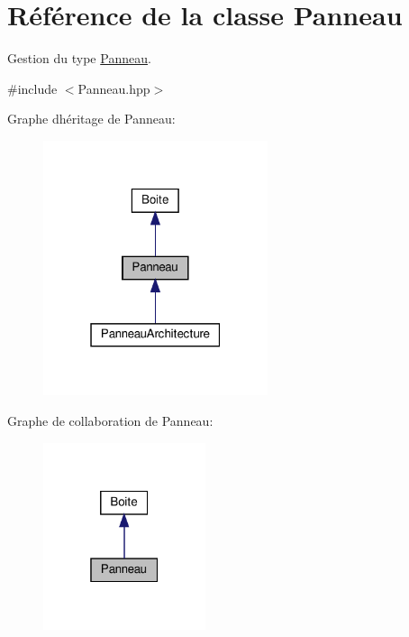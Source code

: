 \hypertarget{classPanneau}{}\section{Référence de la classe Panneau}
\label{classPanneau}


Gestion du type \hyperlink{classPanneau}{Panneau}.  




{\ttfamily \#include $<$Panneau.\+hpp$>$}



Graphe d\textquotesingle{}héritage de Panneau\+:
\nopagebreak
\begin{figure}[H]
\begin{center}
\leavevmode
\includegraphics[width=187pt]{classPanneau__inherit__graph}
\end{center}
\end{figure}


Graphe de collaboration de Panneau\+:
\nopagebreak
\begin{figure}[H]
\begin{center}
\leavevmode
\includegraphics[width=135pt]{classPanneau__coll__graph}
\end{center}
\end{figure}
